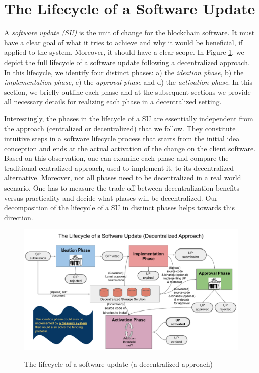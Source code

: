 \section{The Lifecycle of a Software Update}
A \emph{software update (SU)} is the unit of change for the blockchain software. It must have a clear goal of what it tries to achieve and why it would be beneficial, if applied to the system. Moreover, it should have a clear scope. In Figure \ref{lifecycle}, we depict the full lifecycle of a software update following a decentralized approach.
In this lifecycle, we identify four distinct phases: a) the \emph{ideation phase}, b) the \emph{implementation phase}, c) the \emph{approval phase} and d) the \emph{activation phase}. In this section, we briefly outline each phase and at the subsequent sections we provide all necessary details for realizing each phase in a decentralized setting.

Interestingly, the phases in the lifecycle of a SU are essentially independent from the approach (centralized or decentralized) that we follow. They constitute intuitive steps in a software lifecycle process that starts from the initial idea conception and ends at the actual activation of the change on the client software. Based on this observation, one can examine each phase and compare the traditional centralized approach, used to implement it, to its decentralized alternative. Moreover, not all phases need to be decentralized in a real world scenario. One has to measure the trade-off between decentralization benefits versus practicality and decide what phases will be decentralized. Our decomposition of the lifecycle of a SU in distinct phases helps towards this direction.

\begin{figure}[H]
    \caption{The lifecycle of a software update (a decentralized approach)}
    \centering
    \includegraphics[width=0.9 \columnwidth,keepaspectratio]{figures/lifecycle_phases.pdf}
    \label{lifecycle}
\end{figure}

